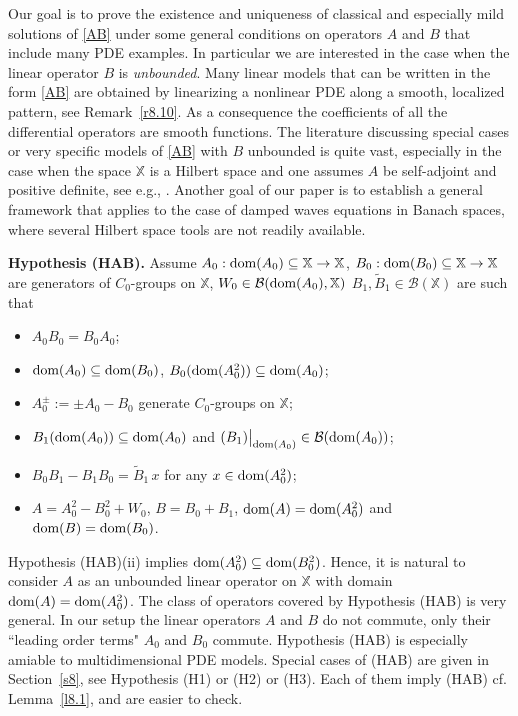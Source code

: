\documentclass[11pt]{amsart}
\numberwithin{equation}{section}
\theoremstyle{remark}
\theoremstyle{definition}
\newcommand\bX{{\mathbb X}}
\newcommand{\dom}{\text{\rm{dom}}}
\begin{document}
Our goal is to prove the existence and uniqueness of classical and especially  mild solutions of \eqref{AB} under some general conditions on operators $A$ and $B$ that include many PDE examples. In particular we are interested in the case when the linear operator $B$ is \emph{unbounded}. Many linear models that can be written in the form \eqref{AB} are obtained by linearizing a nonlinear PDE along a smooth, localized pattern, see Remark~\ref{r8.10}. As a consequence the coefficients of all the differential operators are smooth functions. The literature discussing special cases or very specific models of \eqref{AB} with $B$ unbounded is quite vast, especially in the case when the space $\bX$ is a Hilbert space and one assumes $A$ be self-adjoint and positive definite, see e.g., \cite{Ar,BBD,CR,CT1,CT2,FZG,FST,IT1,IT2,ITY,XL1,XL2,XL3}. Another goal of our paper is to establish a general framework that applies to the case of damped waves equations in Banach spaces, where several Hilbert space tools are not readily available.

\noindent\textbf{Hypothesis (HAB).} Assume $A_0:\dom(A_0)\subseteq\bX\to\bX$, $B_0:\dom(B_0)\subseteq\bX\to\bX$ are
generators of $C_0$-groups on $\bX$, $W_0\in\mathcal{B}(\dom(A_0),\bX)$ $B_1,\widetilde{B}_1\in\mathcal{B}(\bX)$ are such that
\begin{itemize}
	\item[(i)] $A_0 B_0 = B_0 A_0$;
	\item[(ii)] $\dom(A_0) \subseteq \dom(B_0)$,
	$B_0(\dom(A_0^2)) \subseteq \dom(A_0)$;
	\item[(iii)] $A_0^\pm:= \pm A_0 - B_0$ generate $C_0$-groups on $\bX$;
	\item[(iv)] $B_1(\dom(A_0))\subseteq\dom(A_0)$ and $(B_1)\big|_{\dom(A_0)} \in \mathcal{B}(\dom(A_0))$;
	\item[(v)] $B_0 B_1 - B_1 B_0 = \widetilde{B}_1\,x$
	for any $x \in \dom(A_0^2)$;
	\item[(vi)] $A = A_0^2 - B_0^2 + W_0$, $B = B_0 + B_1$, $\dom(A)=\dom(A_0^2)$ and $\dom(B)=\dom(B_0)$.
\end{itemize}
Hypothesis (HAB)(ii) implies $\dom(A_0^2) \subseteq \dom(B_0^2)$. Hence, it is natural to consider $A$ as an unbounded linear operator on $\bX$ with domain $\dom(A) = \dom(A_0^2)$. The class of operators covered by Hypothesis (HAB) is very general. In our setup the linear operators $A$ and $B$ do not commute, only their ``leading order terms" $A_0$ and $B_0$ commute. Hypothesis (HAB) is especially amiable to multidimensional PDE models. 
Special cases of (HAB) are given in Section~\ref{s8}, see Hypothesis (H1) or (H2) or (H3). Each of them imply (HAB) cf. Lemma~\ref{l8.1}, and are easier to check.
\end{document}
